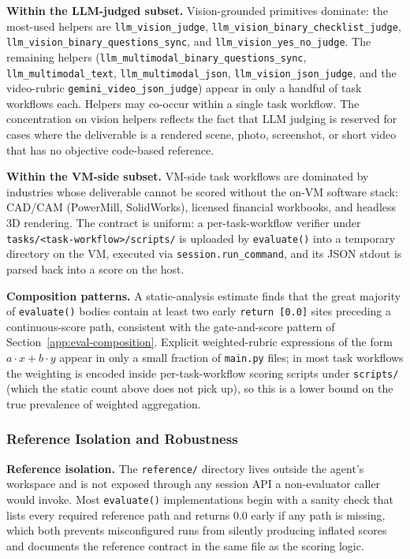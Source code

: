 \noindent \textbf{Within the LLM-judged subset.}
Vision-grounded primitives dominate: the most-used helpers are \texttt{llm\_vision\_judge}, \texttt{llm\_vision\_binary\_checklist\_judge}, \texttt{llm\_vision\_binary\_questions\_sync}, and \texttt{llm\_vision\_yes\_no\_judge}. The remaining helpers (\texttt{llm\_multimodal\_binary\_questions\_sync}, \texttt{llm\_multimodal\_text}, \texttt{llm\_multimodal\_json}, \texttt{llm\_vision\_json\_judge}, and the video-rubric \texttt{gemini\_video\_json\_judge}) appear in only a handful of task workflows each. Helpers may co-occur within a single task workflow. The concentration on vision helpers reflects the fact that LLM judging is reserved for cases where the deliverable is a rendered scene, photo, screenshot, or short video that has no objective code-based reference.

\noindent \textbf{Within the VM-side subset.}
VM-side task workflows are dominated by industries whose deliverable cannot be scored without the on-VM software stack: CAD/CAM (PowerMill, SolidWorks), licensed financial workbooks, and headless 3D rendering. The contract is uniform: a per-task-workflow verifier under \texttt{tasks/<task-workflow>/scripts/} is uploaded by \texttt{evaluate()} into a temporary directory on the VM, executed via \texttt{session.run\_command}, and its JSON stdout is parsed back into a score on the host.

\noindent \textbf{Composition patterns.}
A static-analysis estimate finds that the great majority of \texttt{evaluate()} bodies contain at least two early \texttt{return [0.0]} sites preceding a continuous-score path, consistent with the gate-and-score pattern of Section~\ref{app:eval-composition}. Explicit weighted-rubric expressions of the form $a\cdot x + b\cdot y$ appear in only a small fraction of \texttt{main.py} files; in most task workflows the weighting is encoded inside per-task-workflow scoring scripts under \texttt{scripts/} (which the static count above does not pick up), so this is a lower bound on the true prevalence of weighted aggregation.

\subsubsection{Reference Isolation and Robustness}
\label{app:eval-isolation}

\noindent \textbf{Reference isolation.}
The \texttt{reference/} directory lives outside the agent's workspace and is not exposed through any session API a non-evaluator caller would invoke. Most \texttt{evaluate()} implementations begin with a sanity check that lists every required reference path and returns $0.0$ early if any path is missing, which both prevents misconfigured runs from silently producing inflated scores and documents the reference contract in the same file as the scoring logic.

